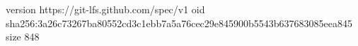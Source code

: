 version https://git-lfs.github.com/spec/v1
oid sha256:3a26c73267ba80552cd3c1ebb7a5a76cec29e845900b5543b637683085eea845
size 848
